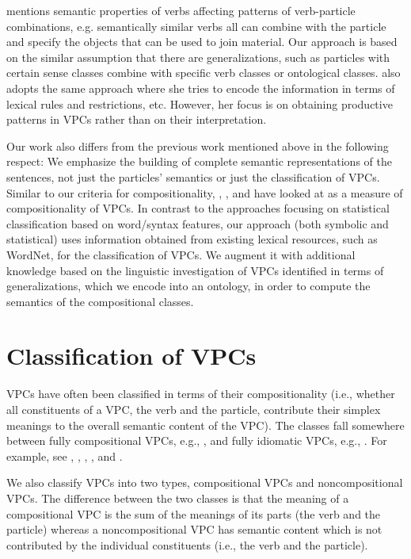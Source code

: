 \documentclass[output=paper,modfonts,nonflat]{langsci/langscibook}
\begin{document}
\citet{Fra76} mentions semantic properties of verbs affecting patterns of verb-particle combinations, e.g. semantically similar verbs  all can combine with the particle  and specify the objects that can be used to join material. Our approach is based on the similar assumption that there are generalizations, such as particles with certain sense classes combine with specific verb classes or ontological classes. \citet{Vil03} also adopts the same approach where she tries to encode the information in terms of lexical rules and restrictions, etc. However, her focus is on obtaining productive patterns in VPCs rather than on their interpretation.

Our work also differs from the previous work mentioned above in the following respect: We emphasize the building of complete semantic representations of the sentences, not just the particles' semantics or just the classification of VPCs. Similar to our criteria for compositionality, \citet{McC03}, \citet{Bal03}, and \citet{Ban03} have looked at  as a measure of compositionality of VPCs. In contrast to the approaches focusing on statistical classification based on word/syntax features, our approach (both symbolic and statistical) uses information obtained from existing lexical resources, such as WordNet, for the classification of VPCs. We augment it with additional knowledge based on the linguistic investigation of VPCs identified in terms of generalizations, which we encode into an ontology, in order to compute the semantics of the compositional classes.


\section{Classification of VPCs} \label{sec:classification}

VPCs have often been classified in terms of their compositionality (i.e., whether all constituents of a VPC, the verb and the particle, contribute their simplex meanings to the overall semantic content of the VPC). The classes fall somewhere between fully compositional VPCs, e.g., , and fully idiomatic VPCs, e.g., . For example, see \citet{Fra76}, \citet{Che86}, \citet{Odo98}, \citet{Deh02}, and \citet{Jac02}.

We also classify VPCs into two types, compositional VPCs and noncompositional VPCs. The difference between the two classes is that the meaning of a compositional VPC is the sum of the meanings of its parts (the verb and the particle) whereas a noncompositional VPC %
has semantic content which is not contributed by the individual constituents (i.e., the verb and the particle). 
\end{document}

